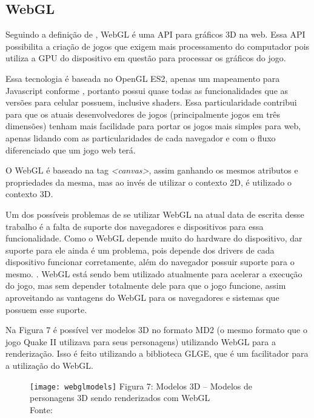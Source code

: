 \subsection{WebGL}

Seguindo a definição de , WebGL é uma API para gráficos 3D na web. Essa
API possibilita a criação de jogos que exigem mais processamento do
computador pois utiliza a GPU do dispositivo em questão para processar
os gráficos do jogo.

Essa tecnologia é baseada no OpenGL ES2, apenas um mapeamento para
Javascript conforme , portanto possui
quase todas as funcionalidades que as versões para celular possuem,
inclusive shaders. Essa particularidade contribui
para que os atuais desenvolvedores de jogos (principalmente jogos em
três dimensões) tenham mais facilidade para portar os jogos mais
simples para web, apenas lidando com as particularidades de cada
navegador e com o fluxo diferenciado que um jogo web terá.

O WebGL é baseado na tag \textit{<canvas>}, assim ganhando os mesmos
atributos e propriedades da mesma, mas ao invés de utilizar o contexto
2D, é utilizado o contexto 3D.

Um dos possíveis problemas de se utilizar WebGL na atual data
de escrita desse trabalho é a falta de suporte dos navegadores e
dispositivos para essa funcionalidade. Como o WebGL depende muito do
hardware do dispositivo, dar suporte para ele ainda é um problema,
pois depende dos drivers de cada dispositivo funcionar
corretamente, além do navegador possuir suporte para o mesmo. \cite{fulton2011html5}.
WebGL está sendo bem utilizado atualmente para acelerar a execução do jogo,
mas sem depender totalmente dele para que o jogo funcione, assim
aproveitando as vantagens do WebGL para os navegadores e sistemas que
possuem esse suporte.

Na Figura 7 é possível ver modelos 3D no formato
MD2 (o mesmo formato que o jogo Quake II utilizava para seus
personagens) utilizando WebGL para a renderização. Isso é feito utilizando a
biblioteca GLGE, que é um facilitador para a utilização do WebGL.

\begin{figure}[H]
  \centering
	\texttt{[image: webglmodels]}
	\footnotesize\hspace{8\baselineskip}
	Figura 7: Modelos 3D {--} Modelos de personagens 3D sendo renderizados com WebGL \\
	Fonte: \cite{webglmodel}
  \label{img:webglmodels}
\end{figure}

